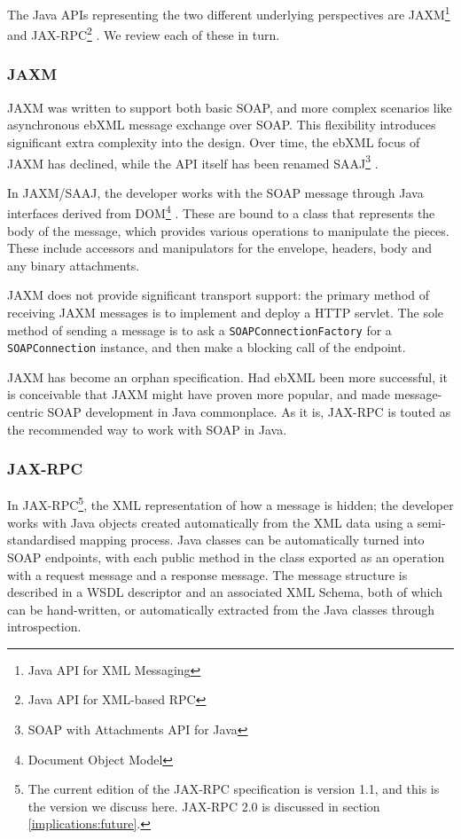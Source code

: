 The Java APIs representing the two different underlying perspectives
are JAXM\footnote{Java API for XML Messaging}
\cite{spec:JAX-M-11} and JAX-RPC\footnote{Java API for XML-based RPC}
\cite{spec:JAX-RPC-11}. We review each of these in turn.

\subsubsection{JAXM}
\label{intro:jaxm}

JAXM was written to support both basic SOAP, and more complex
scenarios like asynchronous ebXML message exchange over SOAP. This
flexibility introduces significant extra complexity into the design.
Over time, the ebXML focus of JAXM has declined, while the API itself
has been renamed SAAJ\footnote{SOAP with Attachments API for Java}
\cite{spec:SAAJ-12}.

In JAXM/SAAJ, the developer works with the SOAP message through Java
interfaces derived from DOM\footnote{Document Object Model}
\cite{spec:DOM}. These are bound to a class that represents the body
of the message, which provides various operations to manipulate the
pieces. These include accessors and manipulators for the envelope,
headers, body and any binary attachments.

JAXM does not provide significant transport support: the primary
method of receiving JAXM messages is to implement and deploy a HTTP
servlet.  The sole method of sending a message is to ask a
{\tt SOAPConnectionFactory} for a {\tt SOAPConnection} instance, and
then make a blocking call of the endpoint.

JAXM has become an orphan specification. Had ebXML been more
successful, it is conceivable that JAXM might have proven more
popular, and made message-centric SOAP development in Java
commonplace. As it is, JAX-RPC is touted as the recommended way to
work with SOAP in Java.

\subsubsection{JAX-RPC}
\label{intro:jax-rpc}

In JAX-RPC\footnote{The current edition of the JAX-RPC specification
is version 1.1, and this is the version we discuss here. JAX-RPC 2.0
is discussed in section \ref{implications:future}.}, the XML representation of
how a message is hidden; the developer works with
Java objects created automatically from the XML data using a
semi-standardised mapping process. Java classes can be automatically
turned into SOAP endpoints, with each public method in the class
exported as an operation with a request message and a response
message. The message structure is described in a WSDL descriptor and an
associated XML Schema, both of which can
be hand-written, or automatically extracted from the Java classes
through introspection.

